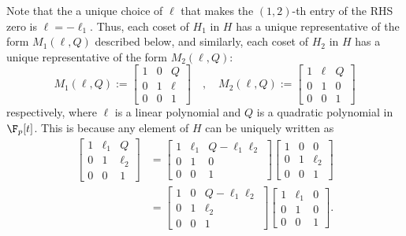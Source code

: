 \documentclass{toc}
\begin{document}
Note that the a unique choice of $\ell$ that makes the $(1,2)$-th entry of the RHS zero is $\ell = -\ell_1$. Thus, each coset of $H_1$ in $H$ has a unique representative of the form $M_1(\ell,Q)$ described below, and similarly, each coset of $H_2$ %
in  %
%
$H$ has a unique representative of the form $M_2(\ell,Q)$: %
\[
M_1(\ell,Q) :=   \begin{bmatrix}
    1 & 0 & Q\\
    0 & 1 & \ell\\
    0 & 0 & 1
  \end{bmatrix} \quad,\quad M_2(\ell,Q) :=   \begin{bmatrix}
    1 & \ell & Q\\
    0 & 1 & 0\\
    0 & 0 & 1
  \end{bmatrix}
\]
respectively, %
where $\ell$ is a linear polynomial and $Q$ is a quadratic polynomial in $\F_p[t]$. %
%
This is because %
any element  %
of $H$ can be uniquely written as %
\begin{align*}
  \begin{bmatrix}
    1 & \ell_1 & Q\\
    0 & 1 & \ell_2\\
    0 & 0 & 1
  \end{bmatrix} & = \begin{bmatrix}
    1 & \ell_1 & Q - \ell_1\ell_2\\
    0 & 1 & 0\\
    0 & 0 & 1
  \end{bmatrix}\begin{bmatrix}
    1 & 0 & 0\\
    0 & 1 & \ell_2\\
    0 & 0 & 1
  \end{bmatrix}\\
  &= \begin{bmatrix}
    1 & 0 & Q - \ell_1\ell_2\\
    0 & 1 & \ell_2\\
    0 & 0 & 1
  \end{bmatrix}
  \begin{bmatrix}
    1 & \ell_1 & 0\\
    0 & 1 & 0\\
    0 & 0 & 1
  \end{bmatrix}.
\end{align*}
\end{document}
